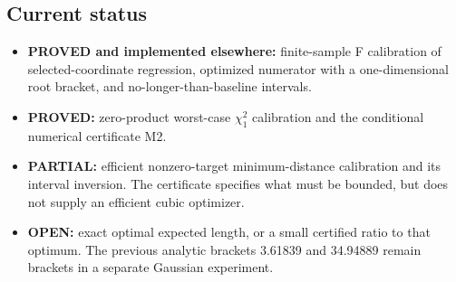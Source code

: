 \documentclass[
  11pt,
]{article}
\providecommand{\tightlist}{%
  \setlength{\itemsep}{0pt}\setlength{\parskip}{0pt}}
\begin{document}
\subsection{Current status}\label{current-status}

\begin{itemize}
\tightlist
\item
  \textbf{PROVED and implemented elsewhere:} finite-sample F calibration
  of selected-coordinate regression, optimized numerator with a
  one-dimensional root bracket, and no-longer-than-baseline intervals.
\item
  \textbf{PROVED:} zero-product worst-case \(\chi ^{2}_1\) calibration
  and the conditional numerical certificate M2.
\item
  \textbf{PARTIAL:} efficient nonzero-target minimum-distance
  calibration and its interval inversion. The certificate specifies what
  must be bounded, but does not supply an efficient cubic optimizer.
\item
  \textbf{OPEN:} exact optimal expected length, or a small certified
  ratio to that optimum. The previous analytic brackets 3.61839 and
  34.94889 remain brackets in a separate Gaussian experiment.
\end{itemize}
\end{document}
